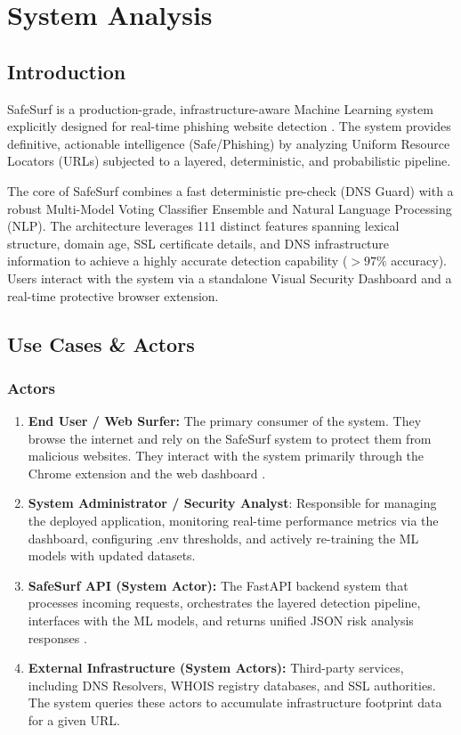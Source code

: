 \chapter{System Analysis}
\section{Introduction}
SafeSurf is a production-grade, infrastructure-aware Machine Learning system explicitly designed for real-time phishing website detection \cite{ref1}. The system provides definitive, actionable intelligence (Safe/Phishing) by analyzing Uniform Resource Locators (URLs) subjected to a layered, deterministic, and probabilistic pipeline. 

The core of SafeSurf combines a fast deterministic pre-check (DNS Guard) with a robust Multi-Model Voting Classifier Ensemble and Natural Language Processing (NLP). The architecture leverages 111 distinct features spanning lexical structure, domain age, SSL certificate details, and DNS infrastructure information to achieve a highly accurate detection capability ($> 97\%$ accuracy). Users interact with the system via a standalone Visual Security Dashboard and a real-time protective browser extension.
\section{Use Cases \&  Actors}
\subsection{Actors}
\begin{enumerate}
    \item \textbf{End User / Web Surfer:} The primary consumer of the system. They browse the internet and rely on the SafeSurf system to protect them from malicious websites. They interact with the system primarily through the Chrome extension and the web dashboard \cite{ref15}.
    \item \textbf{System Administrator / Security Analyst}: Responsible for managing the deployed application, monitoring real-time performance metrics via the dashboard, configuring .env thresholds, and actively re-training the ML models with updated datasets.
    \item \textbf{SafeSurf API (System Actor):} The FastAPI backend system that processes incoming requests, orchestrates the layered detection pipeline, interfaces with the ML models, and returns unified JSON risk analysis responses \cite{ref10}.
    \item \textbf{External Infrastructure (System Actors):} Third-party services, including DNS Resolvers, WHOIS registry databases, and SSL authorities. The system queries these actors to accumulate infrastructure footprint data for a given URL.
\end{enumerate}

